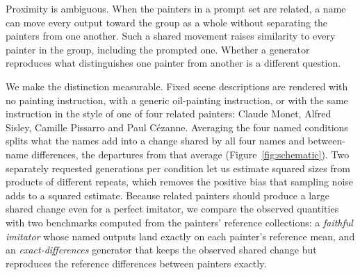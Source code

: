 \documentclass[10pt]{article}
\begin{document}
Proximity is ambiguous. When the painters in a prompt set are related, a name can move every
output toward the group as a whole without separating the painters from one another. Such a shared
movement raises similarity to every painter in the group, including the prompted one. Whether a
generator reproduces what distinguishes one painter from another is a different question.

We make the distinction measurable. Fixed scene descriptions are rendered with no painting
instruction, with a generic oil-painting instruction, or with the same instruction in the style
of one of four related painters: Claude Monet, Alfred Sisley, Camille Pissarro and Paul
C\'ezanne. Averaging the four named conditions splits what the names add into a change shared
by all four names and between-name differences, the departures from that average
(Figure~\ref{fig:schematic}). Two separately requested generations per condition let us
estimate squared sizes from products of different repeats, which removes the positive bias that
sampling noise adds to a squared estimate. Because related painters should produce a large
shared change even for a perfect imitator, we compare the observed quantities with two
benchmarks computed from the painters' reference collections: a \emph{faithful imitator} whose
named outputs land exactly on each painter's reference mean, and an \emph{exact-differences}
generator that keeps the observed shared change but reproduces the reference differences
between painters exactly.
\end{document}
